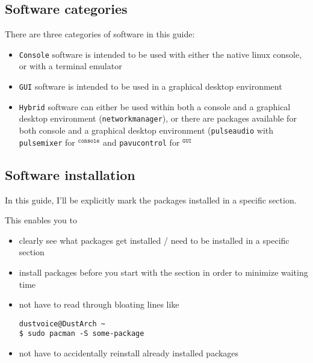 \documentclass[9pt]{report}
\begin{document}
\vfill\eject

\hypertarget{x-software-categories}{\subsection{Software categories}}
There are three categories of software in this guide:


\begin{itemize}

\item \texttt{Console} software is intended to be used with either the native linux console, or with a terminal emulator

\item \texttt{GUI} software is intended to be used in a graphical desktop environment

\item \texttt{Hybrid} software can either be used within both a console and a graphical desktop environment (\texttt{networkmanager}), or there are packages available for both console and a graphical desktop environment (\texttt{pulseaudio} with \texttt{pulsemixer} for ${}^{\texttt{console}}$ and \texttt{pavucontrol} for ${}^{\texttt{GUI}}$

\end{itemize}



\vfill\eject

\hypertarget{x-software-installation}{\subsection{Software installation}}
In this guide, I’ll be explicitly mark the packages installed in a specific section.


This enables you to


\begin{itemize}

\item clearly see what packages get installed / need to be installed in a specific section

\item install packages before you start with the section in order to minimize waiting time

\item not have to read through bloating lines like

\begin{verbatim}
dustvoice@DustArch ~
$ sudo pacman -S some-package
\end{verbatim}
\item not have to accidentally reinstall already installed packages

\end{itemize}
\end{document}

